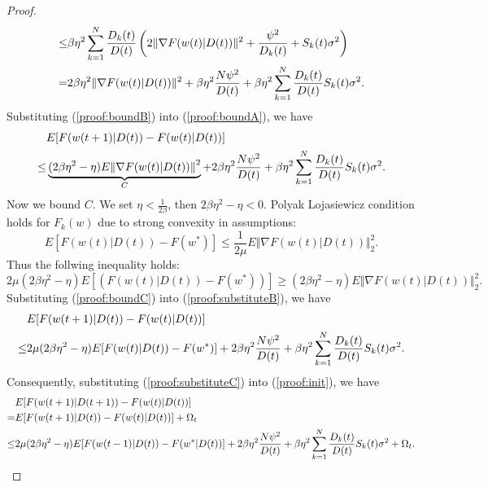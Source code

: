 \documentclass{article}
\theoremstyle{plain}
\theoremstyle{definition}
\theoremstyle{remark}
\begin{document}
\begin{proof}
\begin{align}
    \leq & \beta\eta^2 \sum_{k=1}^{N} \frac{D_k(t)}{D(t)} \left(2\Vert\nabla F(w(t)|D(t))\Vert^2 + \frac{\psi^2}{D_k(t)} + S_k(t)\sigma^2\right) \notag \\
    =    & 2\beta\eta^2 \Vert\nabla F(w(t)|D(t))\Vert^2 + \beta\eta^2 \frac{N\psi^2}{D(t)} + \beta\eta^2 \sum_{k=1}^{N} \frac{D_k(t)}{D(t)} S_k(t) \sigma^2.
  \end{align}
  Substituting (\ref{proof:boundB}) into (\ref{proof:boundA}), we have
  \begin{align}
    \label{proof:substituteB}
    & E[F(w(t+1)|D(t)) - F(w(t)|D(t))] \notag \\
    \leq & \underbrace{ (2\beta \eta^2 - \eta) E{\Vert\nabla F(w(t)|D(t))\Vert}^2}_{C} + 2\beta\eta^2 \frac{N\psi^2}{D(t)} + \beta\eta^2 \sum_{k=1}^{N} \frac{D_k(t)}{D(t)} S_k(t) \sigma^2.
  \end{align}
  Now we bound $C$. We set $\eta < \frac{1}{2\beta}$, then $2\beta\eta^2 - \eta < 0$. Polyak Lojasiewicz condition holds for $F_k(w)$ due to strong convexity in assumptions:
  \begin{equation}
    E[F(w(t)|D(t))-F(w^*)] \leq \frac{1}{2\mu}E{\Vert\nabla F(w(t)|D(t))\Vert}_2^2.
  \end{equation}
  Thus the follwing inequality holds:
  \begin{equation}
    \label{proof:boundC}
    2\mu (2\beta\eta^2 - \eta)E[(F(w(t)|D(t))-F(w^*))] \geq (2\beta \eta^2 - \eta) E{\Vert\nabla F(w(t)|D(t))\Vert}_2^2.
  \end{equation}
  Substituting (\ref{proof:boundC}) into (\ref{proof:substituteB}), we have
  \begin{align}
    \label{proof:substituteC}
         & E[F(w(t+1)|D(t)) - F(w(t)|D(t))] \notag \\
    \leq & 2 \mu(2\beta\eta^2-\eta)E[F(w(t)|D(t))-F(w^*)] + 2\beta\eta^2 \frac{N\psi^2}{D(t)} + \beta\eta^2 \sum_{k=1}^{N} \frac{D_k(t)}{D(t)} S_k(t) \sigma^2.
  \end{align}
  Consequently, substituting (\ref{proof:substituteC}) into (\ref{proof:init}), we have
  \begin{align}
         & E[F(w(t+1)|D(t+1))-F(w(t)|D(t))] \notag \\
    =    & E[F(w(t+1)|D(t))-F(w(t)|D(t))] + \Omega_t \notag \\
    \leq & 2 \mu(2\beta\eta^2-\eta)E[F(w(t-1)|D(t))-F(w^*|D(t))] + 2\beta\eta^2 \frac{N\psi^2}{D(t)} + \beta\eta^2 \sum_{k=1}^{N} \frac{D_k(t)}{D(t)} S_k(t) \sigma^2 + \Omega_t.
  \end{align}

\end{proof}
\end{document}
